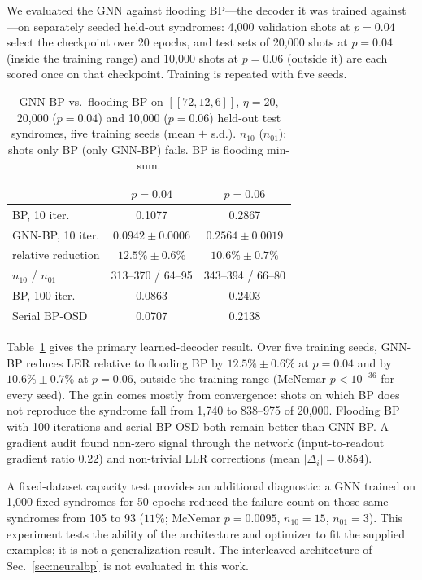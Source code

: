 \documentclass[a4paper,twocolumn,11pt,nopdfoutputerror]{quantumarticle}
\newcommand{\code}[3]{\ensuremath{[\![#1,#2,#3]\!]}}
\begin{document}
We evaluated the GNN against flooding BP---the decoder it was
trained against---on separately seeded held-out syndromes: 4{,}000
validation shots at $p=0.04$ select the checkpoint over 20 epochs, and
test sets of 20{,}000 shots at $p=0.04$ (inside the training range) and
10{,}000 shots at $p=0.06$ (outside it) are each scored once on that
checkpoint. Training is repeated with five seeds.

\begin{table}[t]
\centering
\caption{GNN-BP vs.\ flooding BP on $\code{72}{12}{6}$, $\eta=20$,
         20{,}000 ($p=0.04$) and 10{,}000 ($p=0.06$) held-out test
         syndromes, five training seeds (mean $\pm$ s.d.). $n_{10}$
         ($n_{01}$): shots only BP (only GNN-BP) fails. BP is flooding
         min-sum.}
\label{tab:gnn_flooding}
\footnotesize
\setlength{\tabcolsep}{3.5pt}
\begin{tabular}{@{}lcc@{}}
\toprule
 & $p=0.04$ & $p=0.06$ \\
\midrule
BP, 10 iter.                 & 0.1077 & 0.2867 \\
GNN-BP, 10 iter.             & $0.0942\pm0.0006$ & $0.2564\pm0.0019$ \\
\quad relative reduction     & $12.5\%\pm0.6\%$ & $10.6\%\pm0.7\%$ \\
\quad $n_{10}$ / $n_{01}$    & 313--370 / 64--95 & 343--394 / 66--80 \\
BP, 100 iter.                & 0.0863 & 0.2403 \\
Serial BP-OSD                & 0.0707 & 0.2138 \\
\bottomrule
\end{tabular}
\end{table}

Table~\ref{tab:gnn_flooding} gives the primary learned-decoder result.
Over five training seeds, GNN-BP reduces LER relative to flooding BP by
$12.5\%\pm0.6\%$ at $p=0.04$ and by $10.6\%\pm0.7\%$ at $p=0.06$, outside
the training range (McNemar $p<10^{-36}$ for every seed). The gain comes
mostly from convergence: shots on which BP does not reproduce the
syndrome fall from 1{,}740 to 838--975 of 20{,}000. Flooding BP with 100
iterations and serial BP-OSD both remain better than GNN-BP. A gradient audit found non-zero
signal through the network (input-to-readout gradient ratio $0.22$) and
non-trivial LLR corrections (mean $|\Delta_i|=0.854$).

A fixed-dataset capacity test provides an additional diagnostic: a GNN
trained on 1{,}000 fixed syndromes for 50 epochs reduced the failure
count on those same syndromes from 105 to 93 ($11\%$; McNemar
$p=0.0095$, $n_{10}=15$, $n_{01}=3$). This experiment tests the ability of
the architecture and optimizer to fit the supplied examples; it is not a
generalization result. The interleaved architecture of
Sec.~\ref{sec:neuralbp} is not evaluated in this work.
\end{document}
